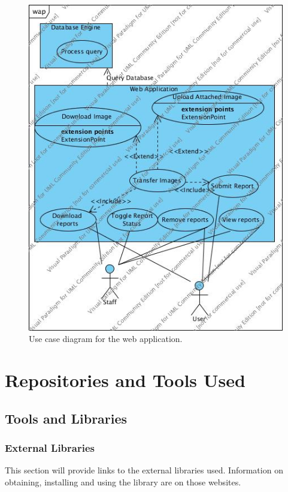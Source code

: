 \documentclass[12pt]{ecsproject}     %
\begin{document}
\begin{figure}[h]
\includegraphics[scale=0.8]{uml/wap.jpg}
\caption{Use case diagram for the web application.}
\end{figure}


\chapter{Repositories and Tools Used}
\label{chap:tools}

\section{Tools and Libraries}
\subsection{External Libraries}
\label{sec:extlib}
This section will provide links to the external libraries used. Information on obtaining, installing and using the library are on those websites.
\end{document}

